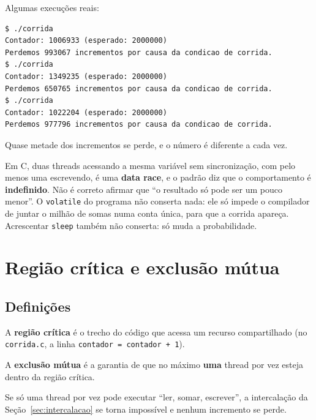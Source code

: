\documentclass[11pt,a4paper]{article}
\newcommand{\raiz}{../../../..}
\newcommand{\cmd}[1]{\texttt{#1}}
\begin{document}


Algumas execuções reais:

\begin{lstlisting}[style=terminal]
$ ./corrida
Contador: 1006933 (esperado: 2000000)
Perdemos 993067 incrementos por causa da condicao de corrida.
$ ./corrida
Contador: 1349235 (esperado: 2000000)
Perdemos 650765 incrementos por causa da condicao de corrida.
$ ./corrida
Contador: 1022204 (esperado: 2000000)
Perdemos 977796 incrementos por causa da condicao de corrida.
\end{lstlisting}

Quase metade dos incrementos se perde, e o número é diferente a cada vez.

\begin{alerta}
Em C, duas threads acessando a mesma variável sem sincronização, com pelo menos uma escrevendo, é uma \textbf{data race}, e o padrão diz que o comportamento é \textbf{indefinido}. Não é correto afirmar que ``o resultado só pode ser um pouco menor''. O \cmd{volatile} do programa não conserta nada: ele só impede o compilador de juntar o milhão de somas numa conta única, para que a corrida apareça. Acrescentar \cmd{sleep} também não conserta: só muda a probabilidade.
\end{alerta}

\section{Região crítica e exclusão mútua}

\subsection{Definições}

\begin{definicao}
A \textbf{região crítica} é o trecho do código que acessa um recurso compartilhado (no \cmd{corrida.c}, a linha \cmd{contador = contador + 1}).

A \textbf{exclusão mútua} é a garantia de que no máximo \textbf{uma} thread por vez esteja dentro da região crítica.
\end{definicao}

Se só uma thread por vez pode executar ``ler, somar, escrever'', a intercalação da Seção~\ref{sec:intercalacao} se torna impossível e nenhum incremento se perde.
\end{document}
